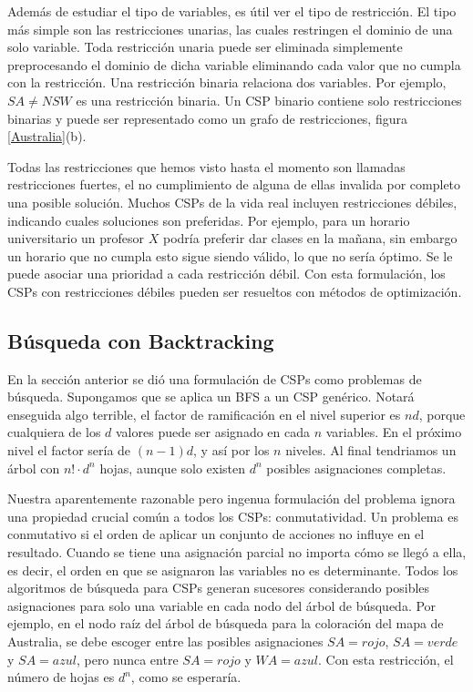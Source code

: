 Adem\'as de estudiar el tipo de variables, es \'util ver el tipo de restricci\'on. El tipo m\'as simple son las restricciones unarias, las cuales restringen el dominio de una solo variable. Toda restricci\'on unaria puede ser eliminada simplemente preprocesando el dominio de dicha variable eliminando cada valor que no cumpla con la restricci\'on. Una restricci\'on binaria relaciona dos variables. Por ejemplo, $SA \neq NSW$ es una restricci\'on binaria. Un CSP binario contiene solo restricciones binarias y puede ser representado como un grafo de restricciones, figura \ref{Australia}(b).

Todas las restricciones que hemos visto hasta el momento son llamadas restricciones fuertes, el no cumplimiento de alguna de ellas invalida por completo una posible soluci\'on. Muchos CSPs de la vida real incluyen restricciones d\'ebiles, indicando cuales soluciones son preferidas. Por ejemplo, para un horario universitario un profesor $X$ podr\'ia preferir dar clases en la mañana, sin embargo un horario que no cumpla esto sigue siendo v\'alido, lo que no ser\'ia \'optimo. Se le puede asociar una prioridad a cada restricci\'on d\'ebil. Con esta formulaci\'on, los CSPs con restricciones d\'ebiles pueden ser resueltos con m\'etodos de optimizaci\'on. 

\subsection{B\'usqueda con Backtracking}

En la secci\'on anterior se di\'o una formulaci\'on de CSPs como problemas de b\'usqueda. Supongamos que se aplica un BFS a un CSP gen\'erico. Notar\'a enseguida algo terrible, el factor de ramificaci\'on en el nivel superior es $nd$, porque cualquiera de los $d$ valores puede ser asignado en cada $n$ variables. En el pr\'oximo nivel el factor ser\'ia de $(n-1)d$, y as\'i por los $n$ niveles. Al final tendriamos un \'arbol con $n! \cdot d^{n}$ hojas, aunque solo existen $d^{n}$ posibles asignaciones completas.

Nuestra aparentemente razonable pero ingenua formulaci\'on del problema ignora una propiedad crucial com\'un a todos los CSPs: conmutatividad. Un problema es conmutativo si el orden de aplicar un conjunto de acciones no influye en el resultado. Cuando se tiene una asignaci\'on parcial no importa c\'omo se lleg\'o a ella, es decir, el orden en que se asignaron las variables no es determinante. Todos los algoritmos de b\'usqueda para CSPs generan sucesores considerando posibles asignaciones para solo una variable en cada nodo del \'arbol de b\'usqueda. Por ejemplo, en el nodo ra\'iz del \'arbol de b\'usqueda para la coloraci\'on del mapa de Australia, se debe escoger entre las posibles asignaciones $SA = rojo$, $SA = verde$ y $SA = azul$, pero nunca entre $SA = rojo$ y $WA = azul$. Con esta restricci\'on, el n\'umero de hojas es $d^{n}$, como se esperar\'ia.

